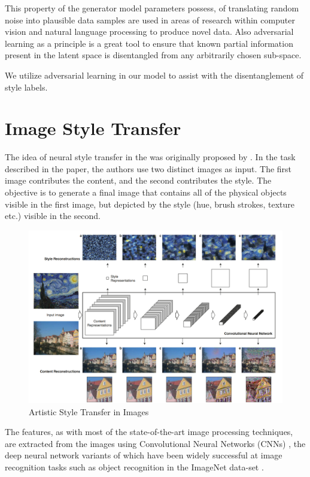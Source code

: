 This property of the generator model parameters possess, of translating random noise into plausible data samples are used in areas of research within computer vision and natural language processing to produce novel data. Also adversarial learning as a principle is a great tool to ensure that known partial information present in the latent space is disentangled from any arbitrarily chosen sub-space.

We utilize adversarial learning in our model to assist with the disentanglement of style labels.


\section{Image Style Transfer}

The idea of neural style transfer in the was originally proposed by \cite{gatys2016image}. In the task described in the paper, the authors use two distinct images as input. The first image contributes the content, and the second contributes the style. The objective is to generate a final image that contains all of the physical objects visible in the first image, but depicted by the style (hue, brush strokes, texture etc.) visible in the second.

\begin{figure}[ht]
	\centering
	\includegraphics[width=\textwidth]{images/image-style-transfer.png}
	\caption{\label{fig:image-style-transfer} Artistic Style Transfer in Images}
\end{figure}

The features, as with most of the state-of-the-art image processing techniques, are extracted from the images using Convolutional Neural Networks (CNNs) \citep{lecun1998gradient}, the deep neural network variants of which have been widely successful at image recognition tasks such as object recognition in the ImageNet data-set \cite{krizhevsky2012imagenet}.

